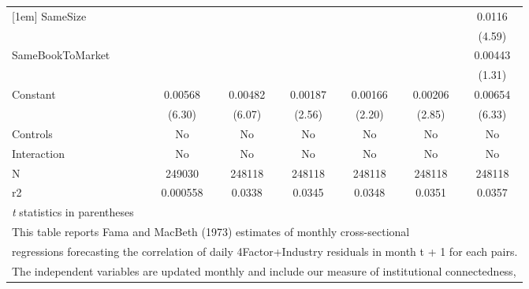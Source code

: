 {\begin{tabular}{l*{6}{c}}
[1em]
SameSize            &                     &                     &                     &                     &                     &      0.0116\sym{***}\\
                    &                     &                     &                     &                     &                     &      (4.59)         \\
[1em]
SameBookToMarket    &                     &                     &                     &                     &                     &     0.00443         \\
                    &                     &                     &                     &                     &                     &      (1.31)         \\
[1em]
Constant            &     0.00568\sym{***}&     0.00482\sym{***}&     0.00187\sym{*}  &     0.00166\sym{*}  &     0.00206\sym{**} &     0.00654\sym{***}\\
                    &      (6.30)         &      (6.07)         &      (2.56)         &      (2.20)         &      (2.85)         &      (6.33)         \\
\hline
Controls            &          No         &          No         &          No         &          No         &          No         &          No         \\
Interaction         &          No         &          No         &          No         &          No         &          No         &          No         \\
N                   &      249030         &      248118         &      248118         &      248118         &      248118         &      248118         \\
r2                  &    0.000558         &      0.0338         &      0.0345         &      0.0348         &      0.0351         &      0.0357         \\
\hline\hline
\multicolumn{7}{l}{\footnotesize \textit{t} statistics in parentheses}\\
\multicolumn{7}{l}{\footnotesize This table reports Fama and MacBeth (1973) estimates of monthly cross-sectional}\\
\multicolumn{7}{l}{\footnotesize  regressions forecasting the correlation of daily 4Factor+Industry residuals in month t + 1 for each pairs.}\\
\multicolumn{7}{l}{\footnotesize The independent variables are updated monthly and include our measure of institutional connectedness,}\\

\end{tabular}}
